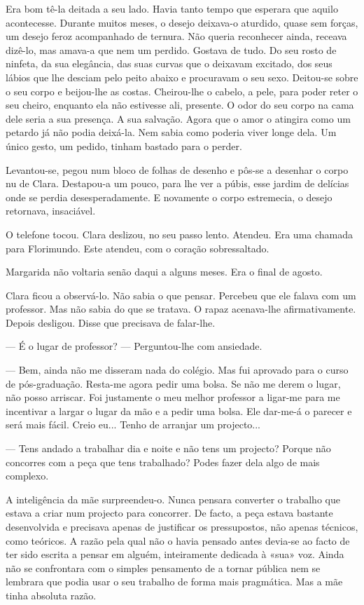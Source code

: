 Era bom tê-la deitada a seu lado. Havia tanto tempo que esperara que
aquilo acontecesse. Durante muitos meses, o desejo deixava-o aturdido,
quase sem forças, um desejo feroz acompanhado de ternura. Não queria
reconhecer ainda, receava dizê-lo, mas amava-a que nem um perdido.
Gostava de tudo. Do seu rosto de ninfeta, da sua elegância, das suas
curvas que o deixavam excitado, dos seus lábios que lhe desciam pelo
peito abaixo e procuravam o seu sexo. Deitou-se sobre o seu corpo e
beijou-lhe as costas. Cheirou-lhe o cabelo, a pele, para poder reter o
seu cheiro, enquanto ela não estivesse ali, presente. O odor do seu
corpo na cama dele seria a sua presença. A sua salvação. Agora que o
amor o atingira como um petardo já não podia deixá-la. Nem sabia como
poderia viver longe dela. Um único gesto, um pedido, tinham bastado para
o perder.

Levantou-se, pegou num bloco de folhas de desenho e pôs-se a desenhar o
corpo nu de Clara. Destapou-a um pouco, para lhe ver a púbis, esse
jardim de delícias onde se perdia desesperadamente. E novamente o corpo
estremecia, o desejo retornava, insaciável.

O telefone tocou. Clara deslizou, no seu passo lento. Atendeu. Era uma
chamada para Florimundo. Este atendeu, com o coração sobressaltado.

Margarida não voltaria senão daqui a alguns meses. Era o final de
agosto.

Clara ficou a observá-lo. Não sabia o que pensar. Percebeu que ele
falava com um professor. Mas não sabia do que se tratava. O rapaz
acenava-lhe afirmativamente. Depois desligou. Disse que precisava de
falar-lhe.

--- É o lugar de professor? --- Perguntou-lhe com ansiedade.

--- Bem, ainda não me disseram nada do colégio. Mas fui aprovado para o
curso de pós-graduação. Resta-me agora pedir uma bolsa. Se não me derem
o lugar, não posso arriscar. Foi justamente o meu melhor professor a
ligar-me para me incentivar a largar o lugar da mão e a pedir uma bolsa.
Ele dar-me-á o parecer e será mais fácil. Creio eu... Tenho de arranjar
um projecto...

--- Tens andado a trabalhar dia e noite e não tens um projecto? Porque não
concorres com a peça que tens trabalhado? Podes fazer dela algo de mais
complexo.

A inteligência da mãe surpreendeu-o. Nunca pensara converter o trabalho
que estava a criar num projecto para concorrer. De facto, a peça estava
bastante desenvolvida e precisava apenas de justificar os pressupostos,
não apenas técnicos, como teóricos. A razão pela qual não o havia
pensado antes devia-se ao facto de ter sido escrita a pensar em alguém,
inteiramente dedicada à «sua» voz. Ainda não se confrontara com o
simples pensamento de a tornar pública nem se lembrara que podia usar o
seu trabalho de forma mais pragmática. Mas a mãe tinha absoluta razão.

